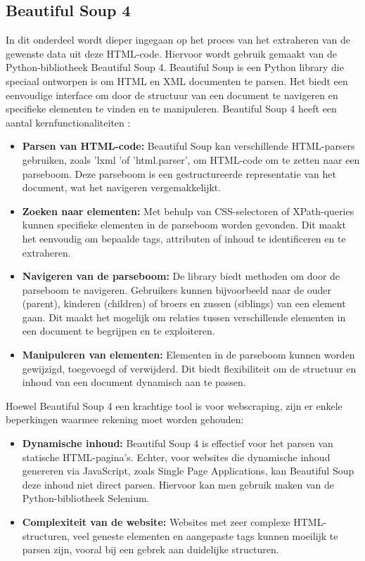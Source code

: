 \subsection{Beautiful Soup 4}
In dit onderdeel wordt dieper ingegaan op het proces van het extraheren van de gewenste data uit deze HTML-code. Hiervoor wordt gebruik gemaakt van de Python-bibliotheek Beautiful Soup 4.
Beautiful Soup is een Python library die speciaal ontworpen is om HTML en XML documenten te parsen. Het biedt een eenvoudige interface om door de structuur van een document te navigeren en specifieke elementen te vinden en te manipuleren. Beautiful Soup 4 heeft een aantal kernfunctionaliteiten \autocite{Soup2004}:

\begin{itemize}
    \item \textbf{Parsen van HTML-code:} Beautiful Soup kan verschillende HTML-parsers gebruiken, zoals 'lxml 'of 'html.parser', om HTML-code om te zetten naar een parseboom. Deze parseboom is een gestructureerde representatie van het document, wat het navigeren vergemakkelijkt.

    \item \textbf{Zoeken naar elementen:} Met behulp van CSS-selectoren of XPath-queries kunnen specifieke elementen in de parseboom worden gevonden. Dit maakt het eenvoudig om bepaalde tags, attributen of inhoud te identificeren en te extraheren.

    \item \textbf{Navigeren van de parseboom:}  De library biedt methoden om door de parseboom te navigeren. Gebruikers kunnen bijvoorbeeld naar de ouder (parent), kinderen (children) of broers en zussen (siblings) van een element gaan. Dit maakt het mogelijk om relaties tussen verschillende elementen in een document te begrijpen en te exploiteren.

    \item \textbf{Manipuleren van elementen:}  Elementen in de parseboom kunnen worden gewijzigd, toegevoegd of verwijderd. Dit biedt flexibiliteit om de structuur en inhoud van een document dynamisch aan te passen.
\end{itemize}

Hoewel Beautiful Soup 4 een krachtige tool is voor webscraping, zijn er enkele beperkingen waarmee rekening moet worden gehouden:

\begin{itemize}
    \item \textbf{Dynamische inhoud:} Beautiful Soup 4 is effectief voor het parsen van statische HTML-pagina's. Echter, voor websites die dynamische inhoud genereren via JavaScript, zoals Single Page Applications, kan Beautiful Soup deze inhoud niet direct parsen. Hiervoor kan men gebruik maken van de Python-bibliotheek Selenium.

    \item \textbf{Complexiteit van de website: } Websites met zeer complexe HTML-structuren, veel geneste elementen en aangepaste tags kunnen moeilijk te parsen zijn, vooral bij een gebrek aan duidelijke structuren.
\end{itemize}

